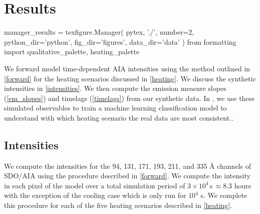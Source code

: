 \section{Results}\label{results}

\begin{pycode}
manager_results = texfigure.Manager(
    pytex,
    './',
    number=2,
    python_dir='python',
    fig_dir='figures',
    data_dir='data'
)
from formatting import qualitative_palette, heating_palette
\end{pycode}

We forward model time-dependent AIA intensities using the method outlined in \autoref{forward} for the heating scenarios discussed in \autoref{heating}. We discuss the synthetic intensities in \autoref{intensities}. We then compute the emission measure slopes (\autoref{em_slopes}) and timelags (\autoref{timelags}) from our synthetic data. In , we use these simulated observables to train a machine learning classification model to understand with which heating scenario the real data are most consistent..

\subsection{Intensities}\label{intensities}

We compute the intensities for the 94, 131, 171, 193, 211, and 335 \AA{} channels of SDO/AIA using the procedure described in \autoref{forward}. We compute the intensity in each pixel of the model \AR{} over a total simulation period of $3\times10^4\,\mathrm{s}\,\approx8.3$ hours with the exception of the cooling case which is only run for $10^4$ s. We complete this procedure for each of the five heating scenarios described in \autoref{heating}.

